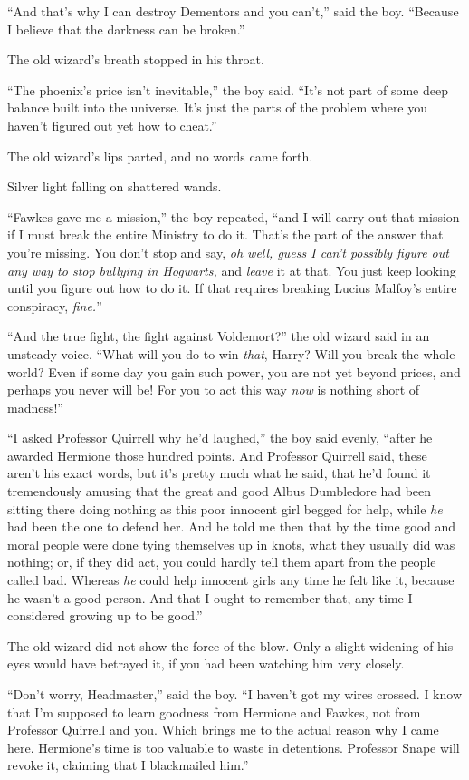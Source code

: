 “And that’s why I can destroy Dementors and you can’t,” said the boy. “Because
I believe that the darkness can be broken.”

The old wizard’s breath stopped in his throat.

“The phoenix’s price isn’t inevitable,” the boy said. “It’s not part of some
deep balance built into the universe. It’s just the parts of the problem where
you haven’t figured out yet how to cheat.”

The old wizard’s lips parted, and no words came forth.

Silver light falling on shattered wands.

“Fawkes gave me a mission,” the boy repeated, “and I will carry out that
mission if I must break the entire Ministry to do it. That’s the part of the
answer that you’re missing. You don’t stop and say, \emph{oh well, guess I
can’t possibly figure out any way to stop bullying in Hogwarts,} and
\emph{leave} it at that. You just keep looking until you figure out how to do
it. If that requires breaking Lucius Malfoy’s entire conspiracy, \emph{fine.}”

“And the true fight, the fight against Voldemort?” the old wizard said in an
unsteady voice. “What will you do to win \emph{that}, Harry? Will you break the
whole world? Even if some day you gain such power, you are not yet beyond
prices, and perhaps you never will be! For you to act this way \emph{now} is
nothing short of madness!”

“I asked Professor Quirrell why he’d laughed,” the boy said evenly, “after he
awarded Hermione those hundred points. And Professor Quirrell said, these
aren’t his exact words, but it’s pretty much what he said, that he’d found it
tremendously amusing that the great and good Albus Dumbledore had been sitting
there doing nothing as this poor innocent girl begged for help, while \emph{he}
had been the one to defend her. And he told me then that by the time good and
moral people were done tying themselves up in knots, what they usually did was
nothing; or, if they did act, you could hardly tell them apart from the people
called bad. Whereas \emph{he} could help innocent girls any time he felt like
it, because he wasn’t a good person. And that I ought to remember that, any
time I considered growing up to be good.”

The old wizard did not show the force of the blow. Only a slight widening of
his eyes would have betrayed it, if you had been watching him very closely.

“Don’t worry, Headmaster,” said the boy. “I haven’t got my wires crossed. I
know that I’m supposed to learn goodness from Hermione and Fawkes, not from
Professor Quirrell and you. Which brings me to the actual reason why I came
here. Hermione’s time is too valuable to waste in detentions. Professor Snape
will revoke it, claiming that I blackmailed him.”

